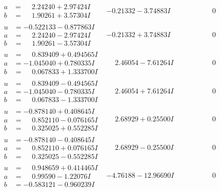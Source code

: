 \documentclass[1p]{elsarticle_modified}
\theoremstyle{definition}
\begin{document}
$$\begin{array}{c|c|c}
\begin{aligned}
a &= \phantom{-}2.24240 + 2.97424 I \\
b &= \phantom{-}1.90261 + 3.57304 I\end{aligned}
 & -0.21332 - 3.74883 I & \phantom{-0.000000 } 0 \\ \hline\begin{aligned}
u &= -0.522133 - 0.877863 I \\
a &= \phantom{-}2.24240 - 2.97424 I \\
b &= \phantom{-}1.90261 - 3.57304 I\end{aligned}
 & -0.21332 + 3.74883 I & \phantom{-0.000000 } 0 \\ \hline\begin{aligned}
u &= \phantom{-}0.839409 + 0.494565 I \\
a &= -1.045040 + 0.780335 I \\
b &= \phantom{-}0.067833 + 1.333700 I\end{aligned}
 & \phantom{-}2.46054 - 7.61264 I & \phantom{-0.000000 } 0 \\ \hline\begin{aligned}
u &= \phantom{-}0.839409 - 0.494565 I \\
a &= -1.045040 - 0.780335 I \\
b &= \phantom{-}0.067833 - 1.333700 I\end{aligned}
 & \phantom{-}2.46054 + 7.61264 I & \phantom{-0.000000 } 0 \\ \hline\begin{aligned}
u &= -0.878140 + 0.408645 I \\
a &= \phantom{-}0.852110 - 0.076165 I \\
b &= \phantom{-}0.325025 + 0.552285 I\end{aligned}
 & \phantom{-}2.68929 + 0.25500 I & \phantom{-0.000000 } 0 \\ \hline\begin{aligned}
u &= -0.878140 - 0.408645 I \\
a &= \phantom{-}0.852110 + 0.076165 I \\
b &= \phantom{-}0.325025 - 0.552285 I\end{aligned}
 & \phantom{-}2.68929 - 0.25500 I & \phantom{-0.000000 } 0 \\ \hline\begin{aligned}
u &= \phantom{-}0.948659 + 0.414465 I \\
a &= \phantom{-}0.99590 - 1.22076 I \\
b &= -0.583121 - 0.960239 I\end{aligned}
 & -4.76188 - 12.96690 I & \phantom{-0.000000 } 0 \\ \hline\begin{aligned}

\end{aligned}
\end{array}$$
\end{document}
